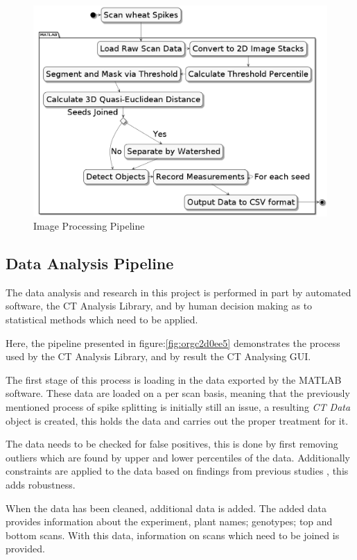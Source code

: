 \documentclass[11pt]{report}
\begin{document}
\begin{figure}[htbp]
\centering
\includegraphics[width=15cm]{./images/matlab.png}
\caption{\label{fig:org5fbba95}
Image Processing Pipeline}
\end{figure}

\subsection{Data Analysis Pipeline}
\label{sec:org5266072}
The data analysis and research in this project is performed in part by automated software, the CT Analysis Library, and by human decision making as to statistical methods which need to be applied.

Here, the pipeline presented in figure:\ref{fig:orgc2d0ee5} demonstrates the process used by the CT Analysis Library, and by result the CT Analysing GUI.

The first stage of this process is loading in the data exported by the MATLAB software. These data are loaded on a per scan basis, meaning that the previously mentioned process of spike splitting is initially still an issue, a resulting \emph{CT Data} object is created, this holds the data and carries out the proper treatment for it.

The data needs to be checked for false positives, this is done by first removing outliers which are found by upper and lower percentiles of the data. Additionally constraints are applied to the data based on findings from previous studies \cite{Hughes2017}, this adds robustness.

When the data has been cleaned, additional data is added. The added data provides information about the experiment, plant names; genotypes; top and bottom scans. With this data, information on scans which need to be joined is provided.
\end{document}
